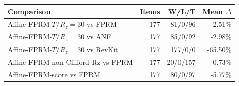\begin{tabular}{lrrr}
\toprule
Comparison & Items & W/L/T & Mean $\Delta$ \\
\midrule
Affine-FPRM-$T/R_z=30$ vs FPRM & 177 & 81/0/96 & -2.51\% \\
Affine-FPRM-$T/R_z=30$ vs ANF & 177 & 85/0/92 & -2.98\% \\
Affine-FPRM-$T/R_z=30$ vs RevKit & 177 & 177/0/0 & -65.50\% \\
Affine-FPRM non-Clifford Rz vs FPRM & 177 & 20/0/157 & -0.73\% \\
Affine-FPRM-score vs FPRM & 177 & 80/0/97 & -5.77\% \\
\bottomrule
\end{tabular}
